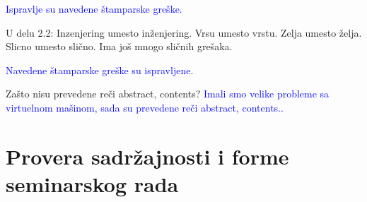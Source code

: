 \documentclass[a4paper]{report}
\newcommand{\odgovor}[1]{\textcolor{blue}{#1}}
\begin{document}
\odgovor{Ispravlje su navedene štamparske greške.}

U delu 2.2:
Inzenjering umesto inženjering.
Vrsu umesto vrstu.
Zelja umesto želja.
Slicno umesto slično.
Ima još mnogo sličnih grešaka.

\odgovor{Navedene štamparske greške su ispravljene.\newline}

Zašto nisu prevedene reči abstract, contents?
\odgovor{\newline Imali smo velike probleme sa virtuelnom mašinom, sada su prevedene reči abstract, contents..}
\section{Provera sadržajnosti i forme seminarskog rada}
\end{document}

